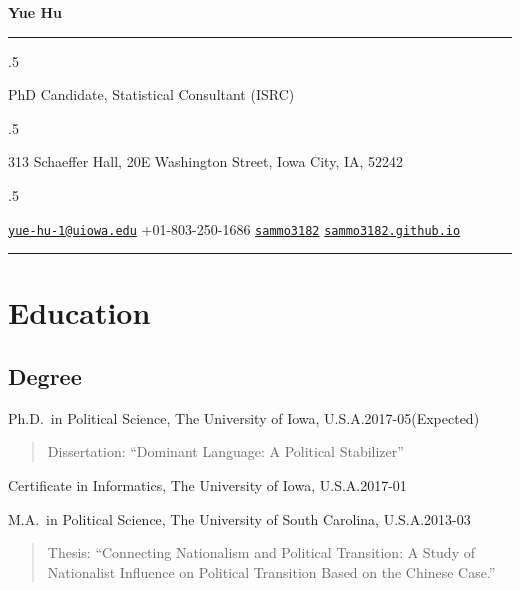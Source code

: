 \documentclass[10.5pt,]{article}
\begin{document}
\centerline{\huge \bf Yue Hu}

\vspace{2 mm}

\hrule

\vspace{2 mm}

\moveleft.5\hoffset\centerline{PhD Candidate, Statistical Consultant (ISRC)}
\moveleft.5\hoffset\centerline{313 Schaeffer Hall, 20E Washington Street, Iowa City, IA, 52242}
\moveleft.5\hoffset\centerline{ \faEnvelopeO \hspace{1 mm} \href{mailto:}{\tt \href{mailto:yue-hu-1@uiowa.edu}{\nolinkurl{yue-hu-1@uiowa.edu}}} \hspace{1 mm}  \faPhone \hspace{1 mm}  +01-803-250-1686  \hspace{1 mm}  \faGithub \hspace{1 mm} \href{http://github.com/sammo3182}{\tt sammo3182} \hspace{1 mm}    \faGlobe \hspace{1 mm} \href{http://sammo3182.github.io}{\tt sammo3182.github.io}   }

\vspace{2 mm}

\hrule


\section{Education}\label{education}

\subsection{Degree}\label{degree}

Ph.D.~in Political Science, The University of Iowa,
U.S.A.\hfill 2017-05(Expected)

\begin{quote}
\footnotesize Dissertation: ``Dominant Language: A Political
Stabilizer''
\end{quote}

Certificate in Informatics, The University of Iowa, U.S.A.\hfill 2017-01

M.A.~in Political Science, The University of South Carolina,
U.S.A.\hfill 2013-03

\begin{quote}
\footnotesize Thesis: ``Connecting Nationalism and Political Transition:
A Study of Nationalist Influence on Political Transition Based on the
Chinese Case.''
\end{quote}
\end{document}

